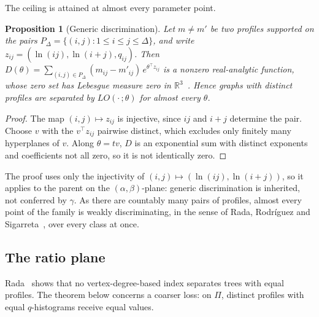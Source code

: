 \documentclass[a5paper, 10pt]{article}
\theoremstyle{plain}
\newtheorem{proposition}[theorem]{Proposition}
\theoremstyle{remark}
\theoremstyle{definition}
\begin{document}
The ceiling is attained at almost every parameter point.

  \begin{proposition}[Generic discrimination]\label{prop:generic}
  Let $m \neq m'$ be two profiles supported on the pairs
  $P_{\Delta} = \{(i,j) : 1 \le i \le j \le \Delta\}$, and write
  $z_{ij} = (\ln(ij), \ln(i+j), q_{ij})$. Then
  $D(\theta) = \sum_{(i,j) \in P_{\Delta}} (m_{ij} - m'_{ij})\,
  e^{\theta^{\top} z_{ij}}$ is a nonzero real-analytic function, whose zero
  set has Lebesgue measure zero in $\mathbb{R}^3$~\cite{Mityagin2020}.
  Hence graphs with distinct profiles are separated by
  $LO(\cdot\,;\theta)$ for almost every $\theta$.
  \end{proposition}

  \begin{proof}
  The map $(i,j) \mapsto z_{ij}$ is injective, since $ij$ and $i+j$
  determine the pair. Choose $v$ with the $v^{\top} z_{ij}$ pairwise
  distinct, which excludes only finitely many hyperplanes of $v$. Along $\theta = tv$, $D$ is an exponential sum with distinct
  exponents and coefficients not all zero, so it is not identically zero.
  \end{proof}

  The proof uses only the injectivity of
  $(i,j) \mapsto (\ln(ij), \ln(i+j))$, so it applies to the parent on the
  $(\alpha,\beta)$-plane: generic discrimination is inherited, not conferred
  by $\gamma$. As there are countably many pairs of profiles, almost every
  point of the family is weakly discriminating, in the sense of Rada,
  Rodr\'iguez and Sigarreta~\cite{RadaRodriguezSigarreta2022Weak}, over
  every class at once.

\subsection{The ratio plane}\label{sec:ratioplane}

  Rada~\cite{Rada2026LinearVDB} shows that no vertex-degree-based index
  separates trees with equal profiles. The theorem below concerns a
  coarser loss: on $\Pi$, distinct profiles with equal $q$-histograms
  receive equal values.
\end{document}
